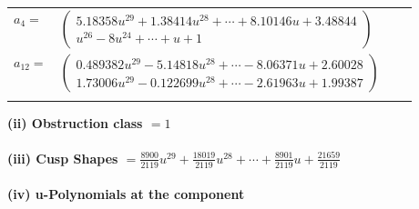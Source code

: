 \documentclass[1p]{elsarticle_modified}
\theoremstyle{definition}
\begin{document}
\begin{tabular}{m{7pt} m{180pt} m{7pt} m{180pt} }
\flushright $a_{4}=$&$\begin{pmatrix}5.18358 u^{29}+1.38414 u^{28}+\cdots+8.10146 u+3.48844\\u^{26}-8 u^{24}+\cdots+u+1\end{pmatrix}$ \\
\flushright $a_{12}=$&$\begin{pmatrix}0.489382 u^{29}-5.14818 u^{28}+\cdots-8.06371 u+2.60028\\1.73006 u^{29}-0.122699 u^{28}+\cdots-2.61963 u+1.99387\end{pmatrix}$\\&\end{tabular}
\flushleft \textbf{(ii) Obstruction class $= 1$}\\~\\
\flushleft \textbf{(iii) Cusp Shapes $= \frac{8900}{2119} u^{29}+\frac{18019}{2119} u^{28}+\cdots+\frac{8901}{2119} u+\frac{21659}{2119}$}\\~\\
\newpage\renewcommand{\arraystretch}{1}
\flushleft \textbf{(iv) u-Polynomials at the component}\newline \\
\end{document}
